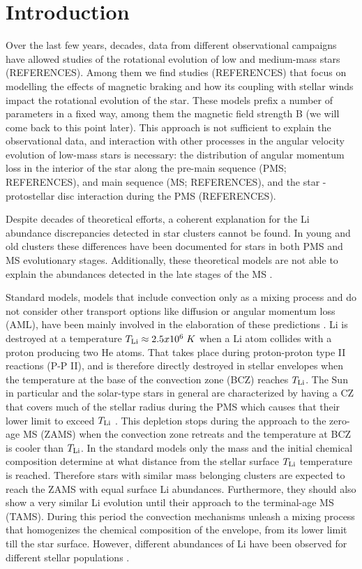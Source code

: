 \documentclass[fleqn,usenatbib]{mnras}
\begin{document}
\section{Introduction} \label{sec_intro}
Over the last few years, decades, data from different observational campaigns have allowed studies of the rotational evolution of low and medium-mass stars (REFERENCES). Among them we find studies (REFERENCES) that focus on modelling the effects of magnetic braking and how its coupling with stellar winds impact the rotational evolution of the star. These models prefix a number of parameters in a fixed way, among them the magnetic field strength B (we will come back to this point later). This approach is not sufficient to explain the observational data, and interaction with other processes in the angular velocity evolution of low-mass stars is necessary: the distribution of angular momentum loss in the interior of the star along the pre-main sequence (PMS; REFERENCES), and main sequence (MS; REFERENCES), and the star - protostellar disc interaction during the PMS (REFERENCES).


Despite decades of theoretical efforts, a coherent explanation for the Li abundance discrepancies detected in star clusters cannot be found. In young and old clusters these differences have been documented for stars in both PMS and MS  evolutionary stages. Additionally, these theoretical models are not able to explain the abundances detected in the late stages of the MS \citep{Tschape2001}.\par

Standard models, models that include convection only as a mixing process and do not consider other transport options like diffusion or angular momentum loss (AML), have been mainly involved in the elaboration of these predictions \citep{Sestito2005}. Li is destroyed at a temperature $T_{\mathrm{Li}} \approx 2.5 x 10^6\; K$ when a Li atom collides with a proton producing two He atoms. That takes place during proton-proton type II reactions (P-P II), and is therefore directly destroyed in stellar envelopes when the temperature at the base of the convection zone (BCZ) reaches  $T_{\mathrm{Li}}$. The Sun in particular and the solar-type stars in general are characterized by having a CZ that covers much of the stellar radius during the PMS which causes that their lower limit to exceed $T_{\mathrm{Li}}$ \citep{Iben1965}. This depletion stops during the approach to the zero-age MS (ZAMS) when the convection zone retreats and the temperature at BCZ is cooler than $T_{\mathrm{Li}}$. In the standard models only the mass and the initial chemical composition determine at what distance from the stellar surface $T_{\mathrm{Li}}$ temperature is reached. Therefore stars with similar mass belonging clusters are expected to reach the ZAMS with equal surface Li abundances. Furthermore, they should also show a very similar Li evolution until their approach to the terminal-age MS (TAMS). During this period the convection mechanisms unleash a mixing process that homogenizes the chemical composition of the envelope, from its lower limit till the star surface. However, different abundances of Li have been observed for different stellar populations \citep[see][and references therein]{Somers2014}.\par
\end{document}

